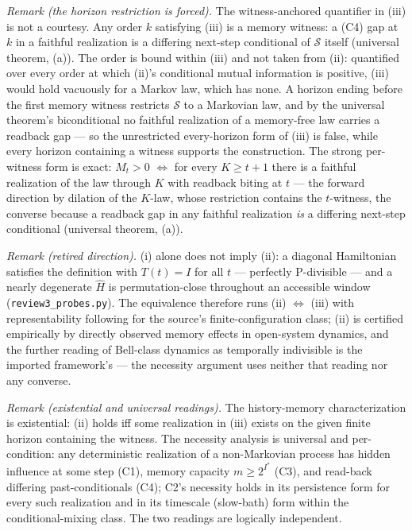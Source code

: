 \documentclass[
]{article}
\begin{document}
\emph{Remark (the horizon restriction is forced).} The witness-anchored
quantifier in (iii) is not a courtesy. Any order \(k\) satisfying (iii)
is a memory witness: a (C4) gap at \(k\) in a faithful realization is a
differing next-step conditional of \(\mathcal{S}\) itself (universal
theorem, (a)). The order is bound within (iii) and not taken from (ii):
quantified over every order at which (ii)'s conditional mutual
information is positive, (iii) would hold vacuously for a Markov law,
which has none. A horizon ending before the first memory witness
restricts \(\mathcal{S}\) to a Markovian law, and by the universal
theorem's biconditional no faithful realization of a memory-free law
carries a readback gap --- so the unrestricted every-horizon form of
(iii) is false, while every horizon containing a witness supports the
construction. The strong per-witness form is exact: \(M_t > 0\) \(\iff\)
for every \(K \geq t+1\) there is a faithful realization of the law
through \(K\) with readback biting at \(t\) --- the forward direction by
dilation of the \(K\)-law, whose restriction contains the \(t\)-witness,
the converse because a readback gap in any faithful realization
\emph{is} a differing next-step conditional (universal theorem, (a)).

\emph{Remark (retired direction).} (i) alone does not imply (ii): a
diagonal Hamiltonian satisfies the definition with \(T(t) = I\) for all
\(t\) --- perfectly P-divisible --- and a nearly degenerate \(\hat{H}\)
is permutation-close throughout an accessible window
(\texttt{review3\_probes.py}). The equivalence therefore runs (ii)
\(\iff\) (iii) with representability following for the source's
finite-configuration class; (ii) is certified empirically by directly
observed memory effects in open-system dynamics, and the further reading
of Bell-class dynamics as temporally indivisible is the imported
framework's --- the necessity argument uses neither that reading nor any
converse.

\emph{Remark (existential and universal readings).} The history-memory
characterization is existential: (ii) holds iff some realization in
(iii) exists on the given finite horizon containing the witness. The
necessity analysis is universal and per-condition: any deterministic
realization of a non-Markovian process has hidden influence at some step
(C1), memory capacity \(m \geq 2^{I^*}\) (C3), and read-back differing
past-conditionals (C4); C2's necessity holds in its persistence form for
every such realization and in its timescale (slow-bath) form within the
conditional-mixing class. The two readings are logically independent.
\end{document}
